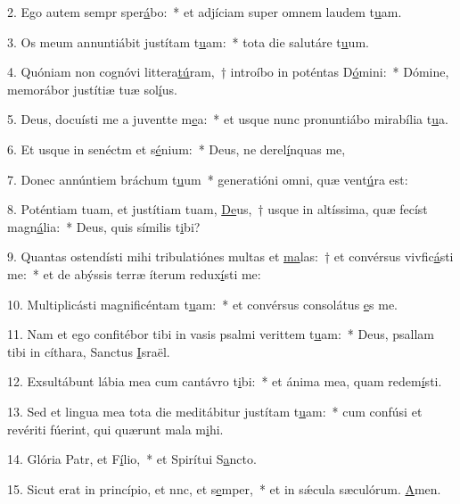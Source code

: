 2. Ego autem sempr sper\uline{á}bo:~* et adjíciam super omnem laudem t\uline{u}am.\par 
3. Os meum annuntiábit justítam t\uline{u}am:~* tota die salutáre t\uline{u}um.\par 
4. Quóniam non cognóvi littera\uline{tú}ram,~† introíbo in poténtas D\uline{ó}mini:~* Dómine, memorábor justítiæ tuæ sol\uline{í}us.\par 
5. Deus, docuísti me a juventte m\uline{e}a:~* et usque nunc pronuntiábo mirabília t\uline{u}a.\par 
6. Et usque in senéctm et s\uline{é}nium:~* Deus, ne derel\uline{í}nquas me,\par 
7. Donec annúntiem bráchum t\uline{u}um~* generatióni omni, quæ vent\uline{ú}ra est:\par 
8. Poténtiam tuam, et justítiam tuam, \uline{De}us,~† usque in altíssima, quæ fecíst magn\uline{á}lia:~* Deus, quis símilis t\uline{i}bi?\par 
9. Quantas ostendísti mihi tribulatiónes multas et \uline{ma}las:~† et convérsus vivfic\uline{á}sti me:~* et de abýssis terræ íterum redux\uline{í}sti me:\par 
10. Multiplicásti magnificéntam t\uline{u}am:~* et convérsus consolátus \uline{e}s me.\par 
11. Nam et ego confitébor tibi in vasis psalmi verittem t\uline{u}am:~* Deus, psallam tibi in cíthara, Sanctus \uline{I}sraël.\par 
12. Exsultábunt lábia mea cum cantávro t\uline{i}bi:~* et ánima mea, quam redem\uline{í}sti.\par 
13. Sed et lingua mea tota die meditábitur justítam t\uline{u}am:~* cum confúsi et revériti fúerint, qui quærunt mala m\uline{i}hi.\par 
14. Glória Patr, et F\uline{í}lio,~* et Spirítui S\uline{a}ncto.\par 
15. Sicut erat in princípio, et nnc, et s\uline{e}mper,~* et in sǽcula sæculórum. \uline{A}men.\par 
